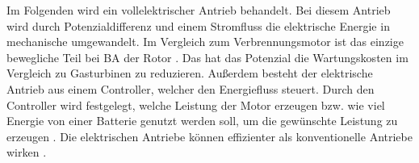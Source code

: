 Im Folgenden wird ein vollelektrischer Antrieb behandelt. 
Bei diesem Antrieb wird durch Potenzialdifferenz und einem Stromfluss die elektrische Energie in mechanische umgewandelt.
%
%
Im Vergleich zum Verbrennungsmotor ist das einzige bewegliche Teil bei BA der Rotor \cite{donckers2024electric}.
Das hat das Potenzial die Wartungskosten im Vergleich zu Gasturbinen zu reduzieren.
Außerdem besteht der elektrische Antrieb aus einem Controller, welcher den Energiefluss steuert. 
Durch den Controller wird festgelegt, welche Leistung der Motor erzeugen bzw. wie viel Energie von 
einer Batterie genutzt werden soll, um die gewünschte Leistung zu erzeugen \cite{donckers2024electric}. 
Die elektrischen Antriebe können effizienter als konventionelle Antriebe wirken \cite{hepperle2012electric}.
%
